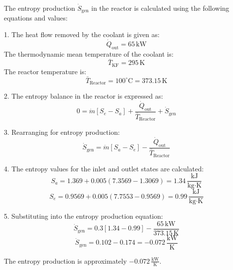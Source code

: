 The entropy production \( \dot{S}_{\text{gen}} \) in the reactor is calculated using the following equations and values:

1. The heat flow removed by the coolant is given as:  
\[
\dot{Q}_{\text{out}} = 65 \, \text{kW}
\]  
The thermodynamic mean temperature of the coolant is:  
\[
\bar{T}_{\text{KF}} = 295 \, \text{K}
\]  
The reactor temperature is:  
\[
\bar{T}_{\text{Reactor}} = 100^\circ\text{C} = 373.15 \, \text{K}
\]

2. The entropy balance in the reactor is expressed as:  
\[
0 = \dot{m} \left[ S_e - S_a \right] + \frac{\dot{Q}_{\text{out}}}{\bar{T}_{\text{Reactor}}} + \dot{S}_{\text{gen}}
\]

3. Rearranging for entropy production:  
\[
\dot{S}_{\text{gen}} = \dot{m} \left[ S_a - S_e \right] - \frac{\dot{Q}_{\text{out}}}{\bar{T}_{\text{Reactor}}}
\]

4. The entropy values for the inlet and outlet states are calculated:  
\[
S_a = 1.369 + 0.005 \left( 7.3569 - 1.3069 \right) = 1.34 \, \frac{\text{kJ}}{\text{kg·K}}
\]  
\[
S_e = 0.9569 + 0.005 \left( 7.7553 - 0.9569 \right) = 0.99 \, \frac{\text{kJ}}{\text{kg·K}}
\]

5. Substituting into the entropy production equation:  
\[
\dot{S}_{\text{gen}} = 0.3 \left[ 1.34 - 0.99 \right] - \frac{65 \, \text{kW}}{373.15 \, \text{K}}
\]  
\[
\dot{S}_{\text{gen}} = 0.102 - 0.174 = -0.072 \, \frac{\text{kW}}{\text{K}}
\]  

The entropy production is approximately \( -0.072 \, \frac{\text{kW}}{\text{K}} \).